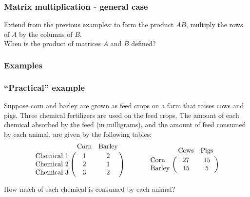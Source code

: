 \documentclass[12pt,t]{beamer}
\begin{document}
\begin{frame}\frametitle{Matrix multiplication - general case}
Extend from the previous examples: to form the product $AB$, multiply the rows of $A$ by the columns of $B$.\\
When is the product of matrices $A$ and $B$ defined? 
 


\end{frame}
\begin{frame}\frametitle{Examples}
 
\end{frame}
\begin{frame}\frametitle{``Practical'' example}
 Suppose corn and barley are grown as feed crops on a farm that raises cows and pigs. Three chemical fertilizers are used on the feed crops. The amount of each chemical absorbed by the feed (in milligrams), and the amount of feed consumed by each animal, are given by the following tables:
\[
 \bordermatrix{& \text{Corn} & \text{Barley}\cr
 \text{Chemical 1} &1 & 2 \cr
 \text{Chemical 2} &2& 1\cr
 \text{Chemical 3} &3 & 2}
\hspace{0.5in} 
 \bordermatrix{& \text{Cows} & \text{Pigs}\cr
 \text{Corn} & 27 & 15 \cr
 \text{Barley} & 15 & 5}
\]


How much of each chemical is consumed by each animal?
\end{frame}
\end{document}
